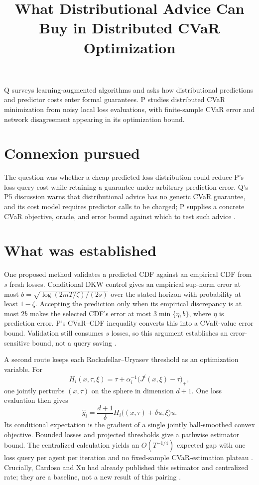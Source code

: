 \documentclass{article}
\title{What Distributional Advice Can Buy in Distributed CVaR Optimization}
\begin{document}
\maketitle

Q surveys learning-augmented algorithms and asks how distributional predictions and predictor costs enter formal guarantees. P studies distributed CVaR minimization from noisy local loss evaluations, with finite-sample CVaR error and network disagreement appearing in its optimization bound.

\section*{Connexion pursued}

The question was whether a cheap predicted loss distribution could reduce P's loss-query cost while retaining a guarantee under arbitrary prediction error. Q's P5 discussion warns that distributional advice has no generic CVaR guarantee, and its cost model requires predictor calls to be charged; P supplies a concrete CVaR objective, oracle, and error bound against which to test such advice .

\section*{What was established}

One proposed method validates a predicted CDF against an empirical CDF from \(s\) fresh losses. Conditional DKW control gives an empirical sup-norm error at most \(b=\sqrt{\log(2mT/\zeta)/(2s)}\) over the stated horizon with probability at least \(1-\zeta\). Accepting the prediction only when its empirical discrepancy is at most \(2b\) makes the selected CDF's error at most \(3\min\{\eta,b\}\), where \(\eta\) is prediction error. P's CVaR--CDF inequality converts this into a CVaR-value error bound. Validation still consumes \(s\) losses, so this argument establishes an error-sensitive bound, not a query saving .

A second route keeps each Rockafellar--Uryasev threshold as an optimization variable. For
\[
H_i(x,\tau,\xi)
=\tau+\alpha_i^{-1}\bigl(J^i(x,\xi)-\tau\bigr)_+,
\]
one jointly perturbs \((x,\tau)\) on the sphere in dimension \(d+1\). One loss evaluation then gives
\[
\widehat g_i
=\frac{d+1}{\delta}
 H_i\bigl((x,\tau)+\delta u,\xi\bigr)u.
\]
Its conditional expectation is the gradient of a single jointly ball-smoothed convex objective. Bounded losses and projected thresholds give a pathwise estimator bound. The centralized calculation yields an \(O(T^{-1/4})\) expected gap with one loss query per agent per iteration and no fixed-sample CVaR-estimation plateau . Crucially, Cardoso and Xu had already published this estimator and centralized rate; they are a baseline, not a new result of this pairing .
\end{document}
